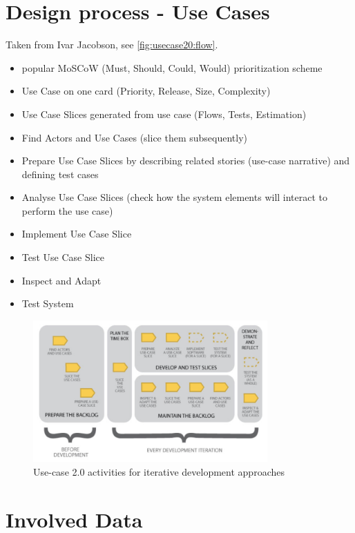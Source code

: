 \section{Design process - Use Cases}
Taken from Ivar Jacobson, see \autoref{fig:usecase20:flow}.
\begin{itemize}
	\item popular MoSCoW (Must, Should, Could, Would) prioritization scheme
	\item Use Case on one card (Priority, Release, Size, Complexity)
	\item Use Case Slices generated from use case (Flows, Tests, Estimation)
	\item Find Actors and Use Cases (slice them subsequently)
	\item Prepare Use Case Slices by describing related stories (use-case narrative) and defining test cases
	\item Analyse Use Case Slices (check how the system elements will interact to perform the use case)
	\item Implement Use Case Slice
	\item Test Use Case Slice
	\item Inspect and Adapt
	\item Test System
\end{itemize}



\begin{figure}[!ht]
\centering
\includegraphics[width=0.8\textwidth]{figures/uc20_flow}
\caption{Use-case 2.0 activities for iterative development approaches}
\label{fig:usecase20:flow}
\end{figure}


\section{Involved Data}
